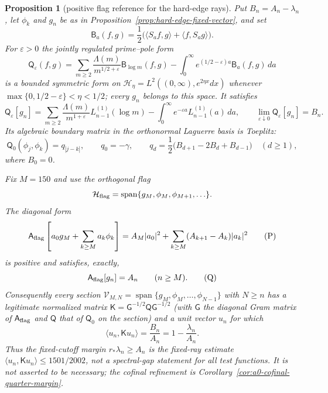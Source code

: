 \documentclass[11pt]{amsart}
\newtheorem{proposition}[theorem]{Proposition}
\theoremstyle{definition}
\theoremstyle{remark}
\theoremstyle{definition}
\begin{document}
\begin{proposition}[positive flag reference for the hard-edge rays]
\label{prop:a1-positive-flag}
Put $B_n=A_n-\lambda_n$, let $\phi_k$ and $g_n$ be as in
Proposition~\ref{prop:hard-edge-fixed-vector}, and set
\[
 \mathsf B_a(f,g)=\frac12\bigl(\langle S_af,g\rangle+
                         \langle f,S_ag\rangle\bigr).
\]
For $\varepsilon>0$ the jointly regulated prime--pole form
\[
 \mathsf Q_\varepsilon(f,g)
 =\sum_{m\ge2}\frac{\Lambda(m)}{m^{1/2+\varepsilon}}
       \mathsf B_{\log m}(f,g)
 -\int_0^\infty e^{(1/2-\varepsilon)a}\mathsf B_a(f,g)\,da
                                                               \tag{M}
\]
is a bounded symmetric form on
$\mathcal H_\eta=L^2((0,\infty),e^{2\eta x}dx)$ whenever
$\max\{0,1/2-\varepsilon\}<\eta<1/2$; every $g_n$ belongs to this space.  It satisfies
\[
 \mathsf Q_\varepsilon[g_n]
 =\sum_{m\ge2}\frac{\Lambda(m)}{m^{1+\varepsilon}}
       L_{n-1}^{(1)}(\log m)
  -\int_0^\infty e^{-\varepsilon a}L_{n-1}^{(1)}(a)\,da,
 \qquad
 \lim_{\varepsilon\downarrow0}\mathsf Q_\varepsilon[g_n]=B_n. \tag{N}
\]
Its algebraic boundary matrix in the orthonormal Laguerre basis is Toeplitz:
\[
 \mathsf Q_0(\phi_j,\phi_k)=q_{|j-k|},\qquad
 q_0=-\gamma,\qquad
 q_d=\frac12\bigl(B_{d+1}-2B_d+B_{d-1}\bigr)\quad(d\ge1),   \tag{O}
\]
where $B_0=0$.

Fix $M=150$ and use the orthogonal flag
\[
 \mathcal H_{\rm flag}=\operatorname{span}
       \{g_M,\phi_M,\phi_{M+1},\ldots\}.
\]
The diagonal form
\[
 \mathsf A_{\rm flag}\left[a_0g_M+\sum_{k\ge M}a_k\phi_k\right]
 =A_M|a_0|^2+\sum_{k\ge M}(A_{k+1}-A_k)|a_k|^2              \tag{P}
\]
is positive and satisfies, exactly,
\[
 \mathsf A_{\rm flag}[g_n]=A_n\qquad(n\ge M).                \tag{Q}
\]
Consequently every section
$\mathcal V_{M,N}=\operatorname{span}\{g_M,\phi_M,\ldots,\phi_{N-1}\}$
with $N\ge n$ has a legitimate normalized matrix
$\mathsf K=\mathsf G^{-1/2}\mathsf Q\mathsf G^{-1/2}$ (with $\mathsf G$ the diagonal Gram matrix of
$\mathsf A_{\rm flag}$ and $\mathsf Q$ that of $\mathsf Q_0$ on the section) and a unit vector
$u_n$ for which
\[
 \boxed{\quad
 \langle u_n,\mathsf Ku_n\rangle=\frac{B_n}{A_n}
 =1-\frac{\lambda_n}{A_n}.
 \quad}                                                       \tag{R}
\]
Thus the fixed-cutoff margin $r_*\lambda_n\ge A_n$ is the fixed-ray estimate
$\langle u_n,\mathsf Ku_n\rangle\le1501/2002$, not a spectral-gap statement for
all test functions.  It is not asserted to be necessary; the cofinal
refinement is Corollary~\ref{cor:a0-cofinal-quarter-margin}.
\end{proposition}
\end{document}
